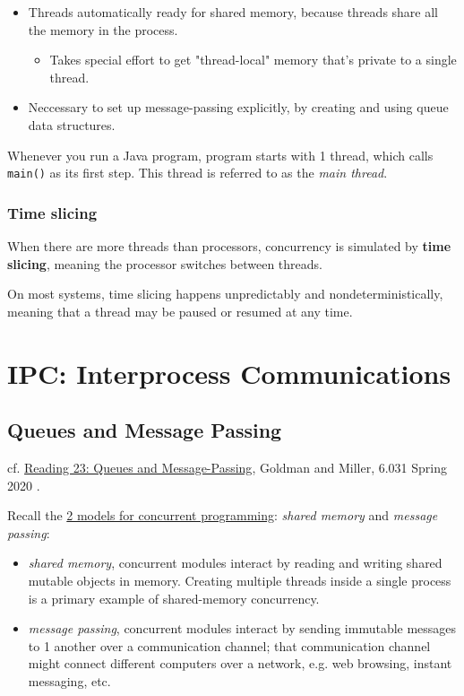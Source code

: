 \documentclass[10pt]{amsart}
\begin{document}
\begin{itemize}
	\item Threads automatically ready for shared memory, because threads share all the memory in the process.
	\begin{itemize}
		\item Takes special effort to get "thread-local" memory that's private to a single thread.		
	\end{itemize}
	\item Neccessary to set up message-passing explicitly, by creating and using queue data structures.
\end{itemize}

Whenever you run a Java program, program starts with 1 thread, which calls \verb|main()| as its first step. This thread is referred to as the \emph{main thread}.

\subsubsection{Time slicing}

When there are more threads than processors, concurrency is simulated by \textbf{time slicing}, meaning the processor switches between threads.

On most systems, time slicing happens unpredictably and nondeterministically, meaning that a thread may be paused or resumed at any time.


\section{IPC: Interprocess Communications}


\subsection{Queues and Message Passing}

cf. \href{http://web.mit.edu/6.031/www/sp20/classes/23-queues/}{Reading 23: Queues and Message-Passing}, Goldman and Miller, 6.031 Spring 2020 \cite{6dot005and6dot031}. 

Recall the \href{http://web.mit.edu/6.031/www/sp20/classes/20-concurrency/#two_models_for_concurrent_programming}{2 models for concurrent programming}: \emph{shared memory} and \emph{message passing}:
\begin{itemize}
	\item \emph{shared memory}, concurrent modules interact by reading and writing shared mutable objects in memory. Creating multiple threads inside a single process is a primary example of shared-memory concurrency.
	\item \emph{message passing}, concurrent modules interact by sending immutable messages to 1 another over a communication channel; that communication channel might connect different computers over a network, e.g. web browsing, instant messaging, etc.
\end{itemize}
\end{document}
